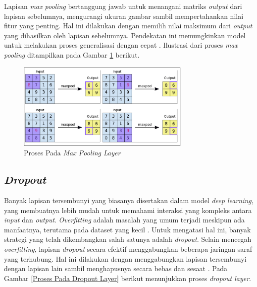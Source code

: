     Lapisan \textit{max pooling} bertanggung jawab untuk menangani matriks \textit{output} dari lapisan sebelumnya, mengurangi ukuran gambar sambil mempertahankan nilai fitur yang penting. Hal ini dilakukan dengan memilih nilai maksimum dari \textit{output} yang dihasilkan oleh lapisan sebelumnya. Pendekatan ini memungkinkan model untuk melakukan proses generalisasi dengan cepat \cite{Gholamalinezhad2020, Nagi2011MaxpoolingCN}. Ilustrasi dari proses \textit{max pooling} ditampilkan pada Gambar \ref{Proses Pada Max Pooling Layer} berikut.


    \begin{figure}[H]
      \centering
      \includegraphics[width=0.75\textwidth]{figures/bab2/pool.png}
      \caption{Proses Pada \textit{Max Pooling Layer} \cite{fiki}}
      \label{Proses Pada Max Pooling Layer}

    
    \end{figure}

\subsection{\textit{Dropout}}

    Banyak lapisan tersembunyi yang biasanya disertakan dalam model \textit{deep learning}, yang membuatnya lebih mudah untuk memahami interaksi yang kompleks antara \textit{input} dan \textit{output}. \textit{Overfitting} adalah masalah yang umum terjadi meskipun ada manfaatnya, terutama pada dataset yang kecil \cite{Srivastava2014}. Untuk mengatasi hal ini, banyak strategi yang telah dikembangkan salah satunya adalah \textit{dropout}. Selain mencegah \textit{overfitting}, lapisan \textit{dropout} secara efektif menggabungkan beberapa jaringan saraf yang terhubung. Hal ini dilakukan dengan menggabungkan lapisan tersembunyi dengan lapisan lain sambil menghapusnya secara bebas dan sesaat \cite{Srivastava2014}. Pada Gambar \ref{Proses Pada Dropout Layer} berikut menunjukkan proses \textit{dropout layer}.

